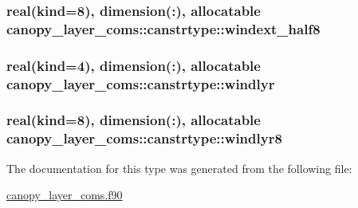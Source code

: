 \subsubsection[{\texorpdfstring{windext\+\_\+half8}{windext_half8}}]{\setlength{\rightskip}{0pt plus 5cm}real(kind=8), dimension(\+:), allocatable canopy\+\_\+layer\+\_\+coms\+::canstrtype\+::windext\+\_\+half8}\hypertarget{structcanopy__layer__coms_1_1canstrtype_a42b218a7ffe018a0a4f6e753471ff11d}{}\label{structcanopy__layer__coms_1_1canstrtype_a42b218a7ffe018a0a4f6e753471ff11d}
\subsubsection[{\texorpdfstring{windlyr}{windlyr}}]{\setlength{\rightskip}{0pt plus 5cm}real(kind=4), dimension(\+:), allocatable canopy\+\_\+layer\+\_\+coms\+::canstrtype\+::windlyr}\hypertarget{structcanopy__layer__coms_1_1canstrtype_a16bdb255323c8c033f924e1a658d7f4f}{}\label{structcanopy__layer__coms_1_1canstrtype_a16bdb255323c8c033f924e1a658d7f4f}
\subsubsection[{\texorpdfstring{windlyr8}{windlyr8}}]{\setlength{\rightskip}{0pt plus 5cm}real(kind=8), dimension(\+:), allocatable canopy\+\_\+layer\+\_\+coms\+::canstrtype\+::windlyr8}\hypertarget{structcanopy__layer__coms_1_1canstrtype_ad29af3fcb9a0ed4dc4985eb8f1714283}{}\label{structcanopy__layer__coms_1_1canstrtype_ad29af3fcb9a0ed4dc4985eb8f1714283}


The documentation for this type was generated from the following file\+:\begin{DoxyCompactItemize}
\item 
\hyperlink{canopy__layer__coms_8f90}{canopy\+\_\+layer\+\_\+coms.\+f90}\end{DoxyCompactItemize}
